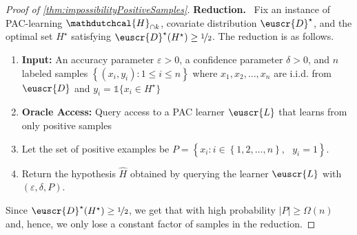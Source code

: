 \documentclass[11pt]{article}
\theoremstyle{plain}
\theoremstyle{definition}
\theoremstyle{remark}
\def\abs#1{\left| #1 \right|}
\newcommand{\sinbrace}[1]{\{#1\}}
\newcommand{\inbrace}[1]{\left\{#1\right\}}
\newcommand{\inparen}[1]{\left(#1\right)}
\newcommand{\nfrac}[2]{\nicefrac{#1}{#2}}
\newcommand{\iid}{i.i.d.}
\newcommand{\eps}{\varepsilon}
\newcommand{\wh}[1]{\widehat{#1}}
\newcommand{\customcal}[1]{\euscr{#1}}
\newcommand{\cD}{\customcal{D}}
\newcommand{\cL}{\customcal{L}}
\renewcommand{\paragraph}[1]{\medskip \noindent\textbf{#1}~}
\newcommand{\hypo}[1]{\mathdutchcal{#1}}
\newcommand{\hyH}{\hypo{H}}
\newcommand{\optset}{{H^\star}}
\newcommand{\cDtrue}{\cD^\star}
\begin{document}
\begin{proof}[Proof of \cref{thm:impossibilityPositiveSamples}]
        \paragraph{Reduction.}
        Fix an instance of PAC-learning {$\hyH_{\cap k}$}, covariate distribution $\cDtrue$, and the optimal set $\optset$ satisfying $\cDtrue(\optset)\geq \nfrac{1}{2}$.
        The reduction is as follows.
        \begin{mdframed}
            \begin{enumerate}[itemsep=-1pt]
                \item[]  \hspace{-6mm} \textbf{Input:} 
                    An accuracy parameter $\eps>0$, a confidence parameter $\delta>0$, and
                    $n$ labeled samples $\inbrace{\inparen{x_i,y_i}\colon 1\leq i\leq n}$ where $x_1,x_2,\dots,x_n$ are \iid{} from $\cD$ and $y_i=\mathds{1}\sinbrace{x_i\in \optset}$
                \item[]  \hspace{-6mm}  \textbf{Oracle Access:}
                    Query access to a PAC learner $\cL$ that learns from only positive samples 
                \vspace{2mm}
                \item Let the set of positive examples be $P=\inbrace{x_i \colon i\in \inbrace{1, 2, \dots,n},~~~ y_i=1}$.
                \item Return the hypothesis $\wh{H}$ obtained by querying the learner $\cL$ with $\inparen{\eps,\delta,P}$.
            \end{enumerate}
        \end{mdframed} 
        Since $\cDtrue(\optset)\geq \nfrac{1}{2}$, we get that with high probability $\abs{P}\geq \Omega(n)$ and, hence, we only lose a constant factor of samples in the reduction.
        
        

\end{proof}
\end{document}
